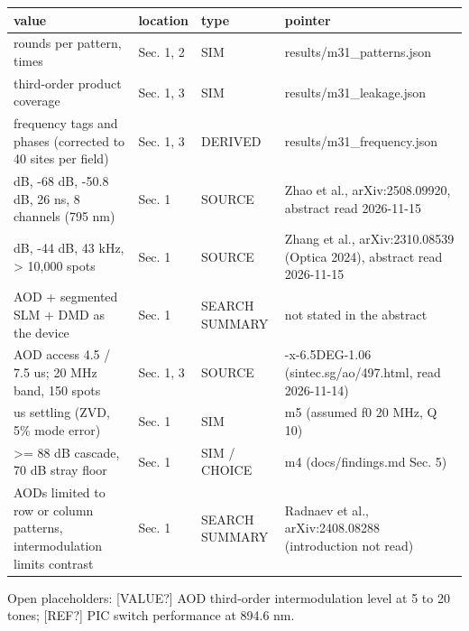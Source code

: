 {\footnotesize
\begin{longtable}[]{@{}>{\raggedright\arraybackslash}p{0.341\dimexpr(\linewidth-8\tabcolsep)\relax}>{\raggedright\arraybackslash}p{0.125\dimexpr(\linewidth-8\tabcolsep)\relax}>{\raggedright\arraybackslash}p{0.108\dimexpr(\linewidth-8\tabcolsep)\relax}>{\raggedright\arraybackslash}p{0.426\dimexpr(\linewidth-8\tabcolsep)\relax}@{}}
\toprule\noalign{}
value & location & type & pointer \\
\midrule\noalign{}
\endhead
\bottomrule\noalign{}
\endlastfoot
rounds per pattern, times & Sec. 1, 2 & SIM &
results/m31\_patterns.json \\
third-order product coverage & Sec. 1, 3 & SIM &
results/m31\_leakage.json \\
frequency tags and phases (corrected to 40 sites per field) & Sec. 1, 3
& DERIVED & results/m31\_frequency.json \\
71.4 dB, -68 dB, -50.8 dB, 26 ns, 8 channels (795 nm) & Sec. 1 & SOURCE
& Zhao et al., arXiv:2508.09920, abstract read 2026-11-15 \\
46 dB, -44 dB, 43 kHz, \textgreater{} 10,000 spots & Sec. 1 & SOURCE &
Zhang et al., arXiv:2310.08539 (Optica 2024), abstract read
2026-11-15 \\
AOD + segmented SLM + DMD as the device & Sec. 1 & SEARCH SUMMARY & not
stated in the abstract \\
AOD access 4.5 / 7.5 us; 20 MHz band, 150 spots & Sec. 1, 3 & SOURCE &
45035-x-6.5DEG-1.06 (sintec.sg/ao/497.html, read 2026-11-14) \\
0.19 us settling (ZVD, 5\% mode error) & Sec. 1 & SIM & m5 (assumed f0
20 MHz, Q 10) \\
\textgreater= 88 dB cascade, 70 dB stray floor & Sec. 1 & SIM / CHOICE &
m4 (docs/findings.md Sec. 5) \\
AODs limited to row or column patterns, intermodulation limits contrast
& Sec. 1 & SEARCH SUMMARY & Radnaev et al., arXiv:2408.08288
(introduction not read) \\
\end{longtable}
}

Open placeholders: {[}VALUE?{]} AOD third-order intermodulation level at
5 to 20 tones; {[}REF?{]} PIC switch performance at 894.6 nm.
